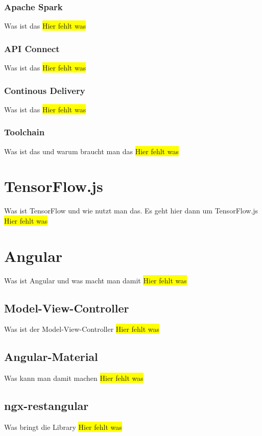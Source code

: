 \subsubsection{Apache Spark}
Was ist das
\colorbox{yellow}{Hier fehlt was}

\subsubsection{API Connect}
Was ist das
\colorbox{yellow}{Hier fehlt was}

\subsubsection{Continous Delivery}
Was ist das
\colorbox{yellow}{Hier fehlt was}

\subsubsection{Toolchain}
Was ist das und warum braucht man das
\colorbox{yellow}{Hier fehlt was}

\section{TensorFlow.js}
Was ist TensorFlow und wie nutzt man das. Es geht hier dann um TensorFlow.js
\colorbox{yellow}{Hier fehlt was}

\section{Angular}
Was ist Angular und was macht man damit
\colorbox{yellow}{Hier fehlt was}

\subsection{Model-View-Controller}
Was ist der Model-View-Controller
\colorbox{yellow}{Hier fehlt was}

\subsection{Angular-Material}
Was kann man damit machen
\colorbox{yellow}{Hier fehlt was}

\subsection{ngx-restangular}
Was bringt die Library
\colorbox{yellow}{Hier fehlt was}

